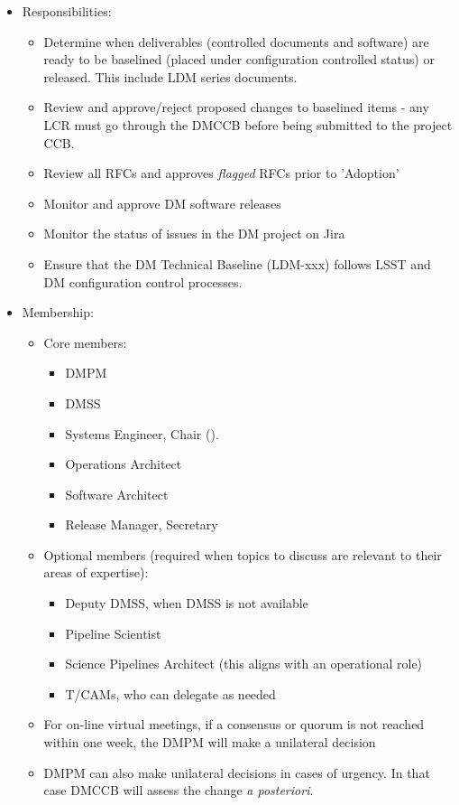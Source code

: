 \begin{itemize}
\item Responsibilities:
        \begin{itemize}
        \item Determine when deliverables (controlled documents and software) are ready to be baselined (placed under configuration controlled status) or released. This include LDM series documents.
        \item Review and approve/reject proposed changes to baselined items - any LCR must go through the DMCCB before being submitted to the project CCB.
        \item Review all RFCs and approves \textit{flagged} RFCs prior to 'Adoption'
        \item Monitor and approve DM software releases
        \item Monitor the status of issues in the DM project on Jira
        \item Ensure that the DM Technical Baseline (LDM-xxx) follows LSST and DM configuration control processes.
        \end{itemize}
\item Membership:
        \begin{itemize}
        \item Core members:
                \begin{itemize}
                \item \gls{DMPM}
                \item \gls{DMSS}
                \item Systems Engineer, Chair ().
                \item Operations Architect
                \item Software Architect
                \item Release Manager, Secretary
                \end{itemize}
        \item Optional members (required when topics to discuss are relevant to their areas of expertise):
                \begin{itemize}
                \item Deputy \gls{DMSS}, when \gls{DMSS} is not available
                \item Pipeline Scientist
		\item Science Pipelines Architect (this aligns with an operational role)%
                \item \glspl{T/CAM}, who can delegate as needed
                \end{itemize}
	\item For on-line virtual meetings, if a consensus or quorum is not reached within one week, the \gls{DMPM} will make a unilateral decision
        \item \gls{DMPM} can also make unilateral decisions in cases of urgency. In that case DMCCB will assess the change \textit{a posteriori}.
	\end{itemize}
\end{itemize}

